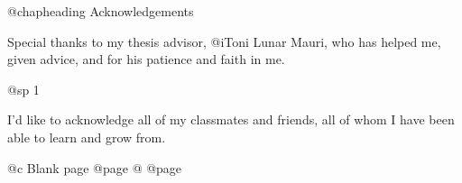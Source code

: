 @chapheading Acknowledgements

Special thanks to my thesis advisor, @i{Toni Lunar Mauri}, who has helped me, given advice, and for his patience and faith in me.

@sp 1

I'd like to acknowledge all of my classmates and friends, all of whom I have been able to learn and grow from.

@c Blank page
@page
@
@page
